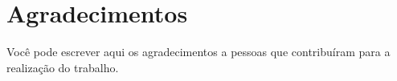 \newpage

\chapter*{Agradecimentos} %

	Você pode escrever aqui os agradecimentos a pessoas que contribuíram para a realização do trabalho.
	
	\thispagestyle{empty}